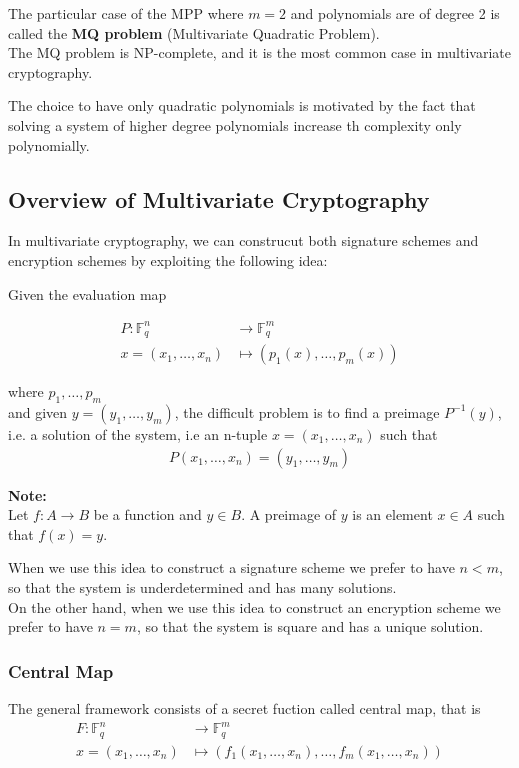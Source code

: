 \noindent
The particular case of the MPP where $m = 2$ and polynomials are of degree 2 is called the \textbf{MQ problem} (Multivariate Quadratic Problem).\\
The MQ problem is NP-complete, and it is the most common case in multivariate cryptography.
\medskip

\noindent
The choice to have only quadratic polynomials is motivated by the fact that solving a system of higher degree polynomials increase th complexity only polynomially.

\subsection{Overview of Multivariate Cryptography}
In multivariate cryptography, we can construcut both signature schemes and encryption schemes by exploiting the following idea:
\medskip

\noindent
Given the evaluation map

\begin{align*}
    P: \mathbb{F}_q^n &\to \mathbb{F}_q^m\\
    x= (x_1, \ldots, x_n) &\mapsto (p_1(x), \ldots, p_m(x))
\end{align*}

\noindent
where $p_1, \ldots, p_m$\\
and given $y = (y_1, \ldots, y_m) $, the difficult problem is to find a preimage $P^{-1}(y)$, i.e. a solution of the system, i.e an n-tuple $x = (x_1, \ldots, x_n)$ such that
\begin{align*}
    P(x_1, \ldots, x_n)= (y_1, \ldots, y_m)
\end{align*}

\noindent
\textbf{Note:}\\
Let $f : A \to B$ be a function and $y \in B$.
A preimage of $y$ is an element $x \in A$ such that $f(x) = y$.
\vspace*{2em}

\noindent
When we use this idea to construct a signature scheme we prefer to have $n < m$, so that the system is underdetermined and has many solutions.\\
On the other hand, when we use this idea to construct an encryption scheme we prefer to have $n = m$, so that the system is square and has a unique solution.

\subsubsection{Central Map}
The general framework consists of a secret fuction called central map, that is
\begin{align*}
    F: \mathbb{F}_q^n &\to \mathbb{F}_q^m\\
    x= (x_1, \ldots, x_n) &\mapsto (f_1(x_1, \ldots, x_n), \ldots, f_m(x_1, \ldots, x_n))
\end{align*}

